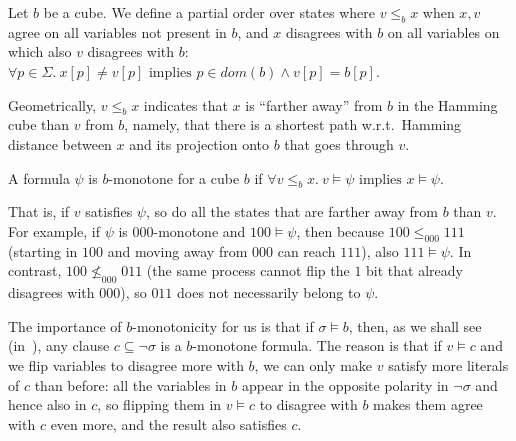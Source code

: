 \documentclass[acmsmall,screen]{acmart}
\newcommand{\dom}[1]{dom({#1})}
\newcommand{\vocabulary}{\Sigma}
\newcommand{\voc}{\vocabulary}
\newcommand{\cubdom}[1]{\dom{#1}}
\begin{document}
%
\begin{changebar}
\begin{definition}
\label{def:b-monotone-order}
Let $b$ be a cube. We define a partial order over states where $v \leq_b x$ when $x,v$ agree on all variables not present in $b$, and $x$ disagrees with $b$ on all variables on which also $v$ disagrees with $b$:
%
%
%
%
%
$\forall p \in \voc. \ x[p] \neq v[p] \mbox{ implies } p \in \cubdom{b} \land v[p]=b[p]$.
%
%
%
\end{definition}
Geometrically, $v \leq_b x$ indicates that $x$ is ``farther away'' from $b$ in the Hamming cube than $v$ from $b$, namely, that there is a shortest path w.r.t.\ Hamming distance between $x$ and its projection onto $b$ that goes through $v$.
%
%
%
\begin{definition}
\label{def:b-monotonicity}
A formula $\psi$ is $b$-monotone for a cube $b$ if
$
\forall v \leq_b x. \ v \models \psi \mbox{ implies } x \models \psi.
$
\end{definition}
That is, if $v$ satisfies $\psi$, so do all the states that are farther away from $b$ than $v$.
For example, if $\psi$ is $000$-monotone and $100 \models \psi$, then because $100 \leq_{000} 111$ (starting in $100$ and moving away from $000$ can reach $111$), also $111 \models \psi$.
In contrast, $100 \not\leq_{000} 011$ (the same process cannot flip the $1$ bit that already disagrees with $000$), so $011$ does not necessarily belong to $\psi$.

The importance of $b$-monotonicity for us is that if $\sigma \models b$, then, as we shall see (in~), any clause $c \subseteq \neg \sigma$ is a $b$-monotone formula.
%
The reason is that if $v \models c$ and we flip variables to disagree more with $b$, we can only make $v$ satisfy more literals of $c$ than before: all the variables in $b$ appear in the opposite polarity in $\neg \sigma$ and hence also in $c$, so flipping them in $v \models c$ to disagree with $b$ makes them agree with $c$ even more, and the result also satisfies $c$. %
%
%


\end{changebar}
\end{document}
